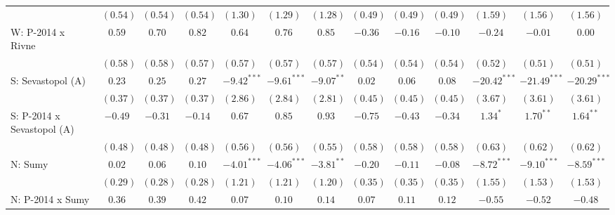 \begin{table}
\begin{center}
\begin{tiny}
\begin{tabular}{l c c c c c c c c c c c c}
                            & $(0.54)$      & $(0.54)$      & $(0.54)$       & $(1.30)$      & $(1.29)$      & $(1.28)$      & $(0.49)$      & $(0.49)$       & $(0.49)$       & $(1.59)$       & $(1.56)$       & $(1.56)$       \\
W: P-2014 x Rivne           & $0.59$        & $0.70$        & $0.82$         & $0.64$        & $0.76$        & $0.85$        & $-0.36$       & $-0.16$        & $-0.10$        & $-0.24$        & $-0.01$        & $0.00$         \\
                            & $(0.58)$      & $(0.58)$      & $(0.57)$       & $(0.57)$      & $(0.57)$      & $(0.57)$      & $(0.54)$      & $(0.54)$       & $(0.54)$       & $(0.52)$       & $(0.51)$       & $(0.51)$       \\
S: Sevastopol (A)           & $0.23$        & $0.25$        & $0.27$         & $-9.42^{***}$ & $-9.61^{***}$ & $-9.07^{**}$  & $0.02$        & $0.06$         & $0.08$         & $-20.42^{***}$ & $-21.49^{***}$ & $-20.29^{***}$ \\
                            & $(0.37)$      & $(0.37)$      & $(0.37)$       & $(2.86)$      & $(2.84)$      & $(2.81)$      & $(0.45)$      & $(0.45)$       & $(0.45)$       & $(3.67)$       & $(3.61)$       & $(3.61)$       \\
S: P-2014 x Sevastopol (A)  & $-0.49$       & $-0.31$       & $-0.14$        & $0.67$        & $0.85$        & $0.93$        & $-0.75$       & $-0.43$        & $-0.34$        & $1.34^{*}$     & $1.70^{**}$    & $1.64^{**}$    \\
                            & $(0.48)$      & $(0.48)$      & $(0.48)$       & $(0.56)$      & $(0.56)$      & $(0.55)$      & $(0.58)$      & $(0.58)$       & $(0.58)$       & $(0.63)$       & $(0.62)$       & $(0.62)$       \\
N: Sumy                     & $0.02$        & $0.06$        & $0.10$         & $-4.01^{***}$ & $-4.06^{***}$ & $-3.81^{**}$  & $-0.20$       & $-0.11$        & $-0.08$        & $-8.72^{***}$  & $-9.10^{***}$  & $-8.59^{***}$  \\
                            & $(0.29)$      & $(0.28)$      & $(0.28)$       & $(1.21)$      & $(1.21)$      & $(1.20)$      & $(0.35)$      & $(0.35)$       & $(0.35)$       & $(1.55)$       & $(1.53)$       & $(1.53)$       \\
N: P-2014 x Sumy            & $0.36$        & $0.39$        & $0.42$         & $0.07$        & $0.10$        & $0.14$        & $0.07$        & $0.11$         & $0.12$         & $-0.55$        & $-0.52$        & $-0.48$        \\

\end{tabular}
\end{tiny}
\end{center}
\end{table}
